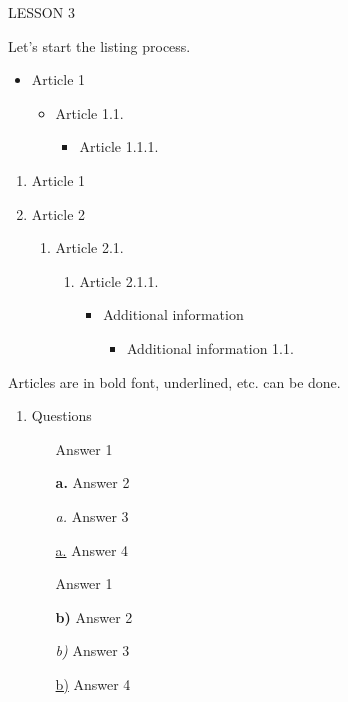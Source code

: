\documentclass[10pt,a4paper]{article}
\begin{document}
	LESSON 3
	
	Let's start the listing process.
	
	\begin{itemize}
		\item Article 1
		\begin{itemize}
			\item Article 1.1.
			\begin{itemize}
				\item Article 1.1.1.
			\end{itemize}
		\end{itemize}
	\end{itemize}
	
	\begin{enumerate}
		\item Article 1
		\item Article 2
		\begin{enumerate}
			\item Article 2.1.
			\begin{enumerate}
				\item Article 2.1.1.
				\begin{itemize}
					\item Additional information
					\begin{itemize}
						\item Additional information 1.1.
					\end{itemize}
				\end{itemize}
			\end{enumerate}
		\end{enumerate}
	\end{enumerate}
	
	Articles are in bold font, underlined, etc. can be done.
	
	\begin{enumerate}
		\item Questions
		\begin{enumerate}
			\item[\text{a.}] Answer 1
			\item[\textbf{a.}] Answer 2
			\item[\textit{a.}] Answer 3
			\item[\underline{a.}] Answer 4
			
			\item[\text{b)}] Answer 1
			\item[\textbf{b)}] Answer 2
			\item[\textit{b)}] Answer 3
			\item[\underline{b)}] Answer 4
			
		\end{enumerate}
	\end{enumerate}
	
\end{document}
